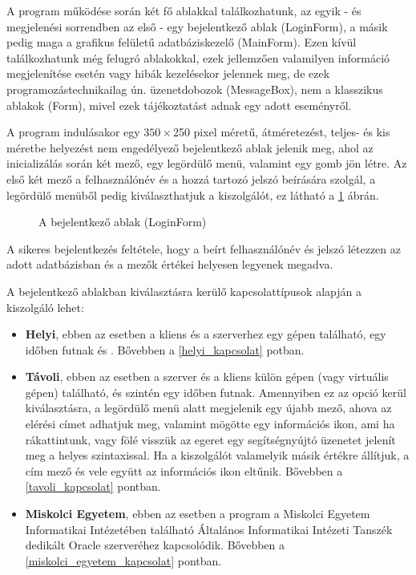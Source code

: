 

\hspace{12.5mm}A program működése során két fő ablakkal találkozhatunk, az egyik - és megjelenési sorrendben az első - egy bejelentkező ablak (LoginForm), a másik pedig maga a grafikus felületű adatbáziskezelő (MainForm).  Ezen kívül találkozhatunk még felugró ablakokkal, ezek jellemzően valamilyen információ megjelenítése esetén vagy hibák kezelésekor jelennek meg, de ezek programozástechnikailag ún. üzenetdobozok (MessageBox), nem a klasszikus ablakok (Form), mivel ezek tájékoztatást adnak egy adott eseményről.

\label{loginform}

A program indulásakor egy $350 \times $250 pixel méretű, átméretezést, teljes- és kis méretbe helyezést nem engedélyező bejelentkező ablak jelenik meg, ahol az inicializálás során két mező, egy legördülő menü, valamint egy gomb jön létre. Az első két mező a felhasználónév és a hozzá tartozó jelszó beírására szolgál, a legördülő menüből pedig kiválaszthatjuk a kiszolgálót, ez látható a \ref{fig:loginForm_connChoices} ábrán.


\begin{figure}[ht]
\centering
{}
\caption{A bejelentkező ablak (LoginForm)} 
\label{fig:loginForm_connChoices}
\end{figure}


A sikeres bejelentkezés feltétele, hogy a beírt felhasználónév és jelszó létezzen az adott adatbázisban és a mezők értékei helyesen legyenek megadva.

A bejelentkező ablakban kiválasztásra kerülő kapcsolattípusok alapján a kiszolgáló lehet:

\begin{itemize}
	\item \textbf{Helyi}, ebben az esetben a kliens és a szerverhez egy gépen található, egy időben futnak és . Bővebben a \ref{helyi_kapcsolat} potban.
	
	\item \textbf{Távoli}, ebben az esetben a szerver és a kliens külön gépen (vagy virtuális gépen) található, és szintén egy időben futnak. Amennyiben ez az opció kerül kiválasztásra, a legördülő menü alatt megjelenik egy újabb mező, ahova az elérési címet adhatjuk meg, valamint mögötte egy információs ikon, ami ha rákattintunk, vagy fölé visszük az egeret egy segítségnyújtó üzenetet jelenít meg a helyes szintaxissal. Ha a kiszolgálót valamelyik másik értékre állítjuk, a cím mező és vele együtt az információs ikon eltűnik. Bővebben a \ref{tavoli_kapcsolat} pontban.
	
	\item \textbf{Miskolci Egyetem}, ebben az esetben a program a Miskolci Egyetem Informatikai Intézetében található Általános Informatikai Intézeti Tanszék dedikált Oracle szerveréhez kapcsolódik. Bővebben a \ref{miskolci_egyetem_kapcsolat} pontban.
\end{itemize}


